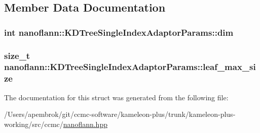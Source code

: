 \subsection{Member Data Documentation}
\hypertarget{structnanoflann_1_1_k_d_tree_single_index_adaptor_params_a3fa490f233559594e34b3c1fcb8e5057}{
\subsubsection[{dim}]{\setlength{\rightskip}{0pt plus 5cm}int nanoflann\-::\-K\-D\-Tree\-Single\-Index\-Adaptor\-Params\-::dim}}\label{structnanoflann_1_1_k_d_tree_single_index_adaptor_params_a3fa490f233559594e34b3c1fcb8e5057}
\hypertarget{structnanoflann_1_1_k_d_tree_single_index_adaptor_params_aa355e5ec6b36fbf75a77aef8b5287fca}{
\subsubsection[{leaf\-\_\-max\-\_\-size}]{\setlength{\rightskip}{0pt plus 5cm}size\-\_\-t nanoflann\-::\-K\-D\-Tree\-Single\-Index\-Adaptor\-Params\-::leaf\-\_\-max\-\_\-size}}\label{structnanoflann_1_1_k_d_tree_single_index_adaptor_params_aa355e5ec6b36fbf75a77aef8b5287fca}


The documentation for this struct was generated from the following file\-:\begin{DoxyCompactItemize}
\item 
/\-Users/apembrok/git/ccmc-\/software/kameleon-\/plus/trunk/kameleon-\/plus-\/working/src/ccmc/\hyperlink{nanoflann_8hpp}{nanoflann.\-hpp}\end{DoxyCompactItemize}
